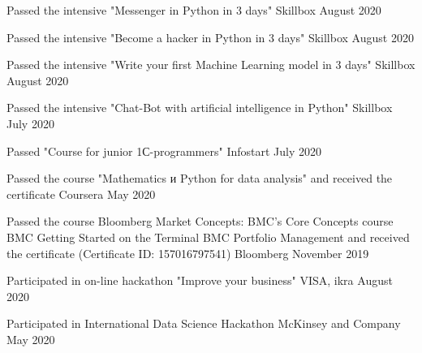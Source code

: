 \documentclass[]{awesome-cv}
\begin{document}
	
\begin{cventries}
	\cventry
		{}
	{Passed the intensive "Messenger in Python in 3 days"}
	{Skillbox}
	{August 2020}
	{}
	\end{cventries} \vspace{-5mm}\begin{cventries}
	\cventry
		{}
	{Passed the intensive "Become a hacker in Python in 3 days"}
	{Skillbox}
	{August 2020}
	{}
	\end{cventries} \vspace{-5mm}\begin{cventries}
	\cventry
		{}
	{Passed the intensive "Write your first Machine Learning model in 3 days"}
	{Skillbox}
	{August 2020}
	{}
	\end{cventries} \vspace{-5mm}\begin{cventries}
	\cventry
		{}
	{Passed the intensive "Chat-Bot with artificial intelligence in Python"}
	{Skillbox}
	{July 2020}
	{}
	\end{cventries} \vspace{-5mm}\begin{cventries}
	\cventry
		{}
	{Passed  "Course for junior 1С-programmers" }
	{Infostart}
	{July 2020}
	{}
	\end{cventries} \vspace{-5mm}\begin{cventries}
	\cventry
		{}
	{Passed the course "Mathematics и Python for data analysis" and received the certificate }
	{Coursera}
	{May 2020}
	{}
	\end{cventries} \vspace{-6mm} \begin{cventries}
	
	\cventry
		{}
	{Passed the course Bloomberg Market Concepts:
	\newline \quad \bullet BMC's Core Concepts course
	\newline \quad \bullet BMC Getting Started on the Terminal
	\newline \quad \bullet BMC Portfolio Management
	\newline \quad and received the certificate (Certificate ID: 157016797541)}
	{Bloomberg}
	{November 2019}
	{}
	\end{cventries} 
	\vspace{-5mm}


\begin{cventries}
	\cventry
	{}
	{Participated in on-line hackathon "Improve your business"}
	{VISA, ikra}
	{August 2020}
	{}
	\end{cventries}  \vspace{-5mm} \begin{cventries}
	\cventry	
	{}
	{Participated in International Data Science Hackathon}
	{McKinsey and Company}
	{May 2020}
	{}
		\end{cventries}  \vspace{-5mm}
\end{document}

